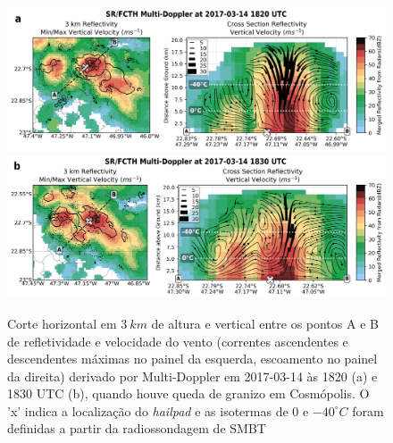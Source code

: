 \begin{figure}[htb]
	\centering
	\caption{Corte horizontal em $3\:km$ de altura e vertical entre os pontos A e B de refletividade e velocidade do vento (correntes ascendentes e descendentes máximas no painel da esquerda, escoamento no painel da direita) derivado por Multi-Doppler em 2017-03-14 às 1820 (a) e 1830 UTC (b), quando houve queda de granizo em Cosmópolis. O 'x' indica a localização do \textit{hailpad} e as isotermas de $0$ e $-40^{\circ}C$ foram definidas a partir da radiossondagem de SMBT} 
	\label{doppler_20170314_1}
	\vspace{-5pt}
	\includegraphics[width=\columnwidth]{../MultiDoppler_Processing/figures/SR-FCTH 2017-03-14 1820 UTC.png} \\
	\vspace{-5pt}
	\includegraphics[width=\columnwidth]{../MultiDoppler_Processing/figures/SR-FCTH 2017-03-14 1830 UTC.png} \\
\end{figure}

